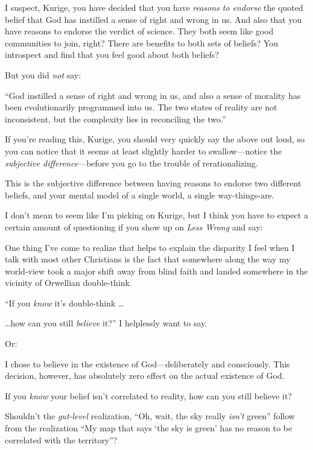 {
 I suspect, Kurige, you have decided that you have \textit{reasons
to endorse} the quoted belief that God has instilled a sense of right
and wrong in us. And also that you have reasons to endorse the verdict
of science. They both seem like good communities to join, right? There
are benefits to both sets of beliefs? You introspect and find that you
feel good about both beliefs?}

{
 But you did \textit{not} say:}

{
 ``God instilled a sense of right and wrong in us,
and also a sense of morality has been evolutionarily programmed into
us. The two states of reality are not inconsistent, but the complexity
lies in reconciling the two.''}

{
 If you're reading this, Kurige, you should very
quickly say the above out loud, so you can notice that it seems at
least slightly harder to swallow---notice the \textit{subjective
difference}{}---before you go to the trouble of rerationalizing.}

{
 This is the subjective difference between having reasons to
endorse two different beliefs, and your mental model of a single world,
a single way-things-are.}

\myendsectiontext


{
 I don't mean to seem like I'm
picking on Kurige, but I think you have to expect a certain amount of
questioning if you show up on \textit{Less Wrong} and say:}

{
 One thing I've come to realize that helps to
explain the disparity I feel when I talk with most other Christians is
the fact that somewhere along the way my world-view took a major shift
away from blind faith and landed somewhere in the vicinity of Orwellian
double-think.}

{
 ``If you \textit{know} it's
double-think \ldots}

{
 \ldots how can you still \textit{believe} it?'' I
helplessly want to say.}

{
 Or:}

{
 I chose to believe in the existence of God---deliberately and
consciously. This decision, however, has absolutely zero effect on the
actual existence of God.}

{
 If you \textit{know} your belief isn't correlated
to reality, how can you still believe it?}

{
 Shouldn't the \textit{gut-level} realization,
``Oh, wait, the sky really
\textit{isn't} green'' follow from
the realization ``My map that says `the
sky is green' has no reason to be correlated with the
territory''?}

